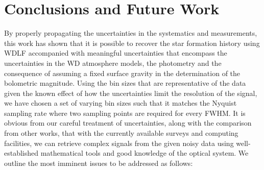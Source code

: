 \documentclass[fleqn,usenatbib]{mnras}
\begin{document}
\section{Conclusions and Future Work}
\label{sec:conclusion}
By properly propagating the uncertainties in the systematics and measurements,
this work has shown that it is possible to recover the star formation history 
using WDLF accompanied with meaningful uncertainties that encompass the 
uncertainties in the WD atmosphere models, the photometry and the consequence
of assuming a fixed surface gravity in the determination of the bolometric 
magnitude. Using the bin sizes that are representative of the data given the
known effect of how the uncertainties limit the resolution of the signal, we
have chosen a set of varying bin sizes such that it matches the Nyquist
sampling rate where two sampling points are required for every FWHM. It is 
obvious from our careful treatment of uncertainties, along with the comparison 
from other works, that with the currently available surveys and computing
facilities, we can retrieve complex signals from the given noisy data using
well-established mathematical tools and good knowledge of the optical system.
We outline the most imminent issues to be addressed as follows:

\end{document}
